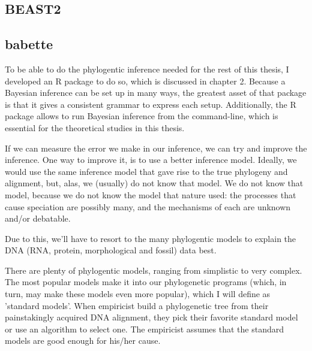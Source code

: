 \subsection{BEAST2}

\subsection{babette}

To be able to do the phylogentic inference needed for the rest of this
thesis, I developed an R package to do so, which
is discussed in chapter 2. Because a Bayesian inference can be set up in
many ways, the greatest asset of that package is that it gives a
consistent grammar to express each setup. Additionally, the R package allows
to run Bayesian inference from the command-line, which is essential for
the theoretical studies in this thesis.

If we can measure the error we make in our inference, 
we can try and improve the inference. 
One way to improve it, is to use a better inference model.
Ideally, we would use the same inference model that gave rise to
the true phylogeny and alignment, but, alas, 
we (usually) do not know that model.
We do not know that model, because we do not know the
model that nature used: the
processes that cause speciation are possibly many, and 
the mechanisms of each are unknown and/or debatable.


Due to this, we'll have to resort to the many phylogentic models 
to explain the DNA (RNA, protein, morphological and fossil) data best.

There are plenty of phylogentic models, ranging from simplistic to
very complex. The most popular models make it into our
phylogenetic programs (which, in turn, may make these models even
more popular), which I will define as 'standard models'.
When empiricist build a phylogenetic tree from their
painstakingly acquired DNA alignment, they pick their favorite standard
model or use an algorithm to select one. The empiricist assumes that the
standard models are good enough for his/her cause.

